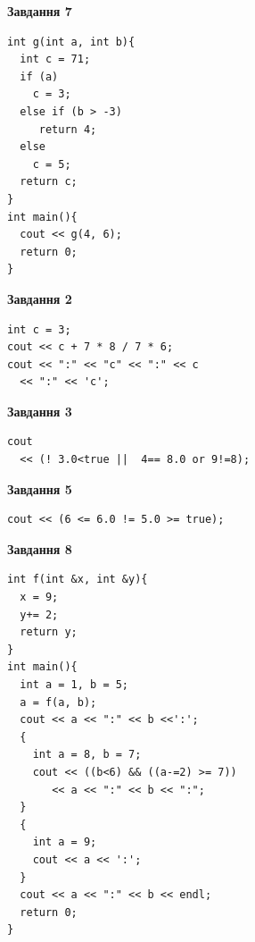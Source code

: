 \documentclass[12pt, ukrainian]{article}
\begin{document}
{\begin {large}
\begin{minipage}[t]{7.0cm}
\begin{center}
\textbf{Завдання 7}
\end{center}
\vspace{-8mm}

\begin{verbatim}
int g(int a, int b){
  int c = 71;
  if (a)
    c = 3;
  else if (b > -3)
     return 4;
  else
    c = 5;
  return c;
}
int main(){
  cout << g(4, 6);
  return 0;
}
\end{verbatim}

\end{minipage}
\vline \hspace{1mm}
\begin{minipage}[t]{11.0cm}

\begin{center}
\textbf{Завдання 2}
\end{center}
\vspace{-8mm}

\begin{verbatim}
int c = 3;
cout << c + 7 * 8 / 7 * 6;
cout << ":" << "c" << ":" << c 
  << ":" << 'c';
\end{verbatim}



\begin{center}
\textbf{Завдання 3}
\end{center}
\vspace{-8mm}

\begin{verbatim}
cout 
  << (! 3.0<true ||  4== 8.0 or 9!=8);
\end{verbatim}



\begin{center}
\textbf{Завдання 5}
\end{center}
\vspace{-8mm}

\begin{verbatim}
cout << (6 <= 6.0 != 5.0 >= true);
\end{verbatim}



\begin{center}
\textbf{Завдання 8}
\end{center}
\vspace{-8mm}

\begin{verbatim}
int f(int &x, int &y){
  x = 9;
  y+= 2;
  return y;
}
int main(){
  int a = 1, b = 5;
  a = f(a, b);
  cout << a << ":" << b <<':';
  {
    int a = 8, b = 7;
    cout << ((b<6) && ((a-=2) >= 7))
       << a << ":" << b << ":";
  }
  {
    int a = 9;
    cout << a << ':';
  }
  cout << a << ":" << b << endl;
  return 0;
}
\end{verbatim}


\end{minipage}
\end{large}}
\end{document}
